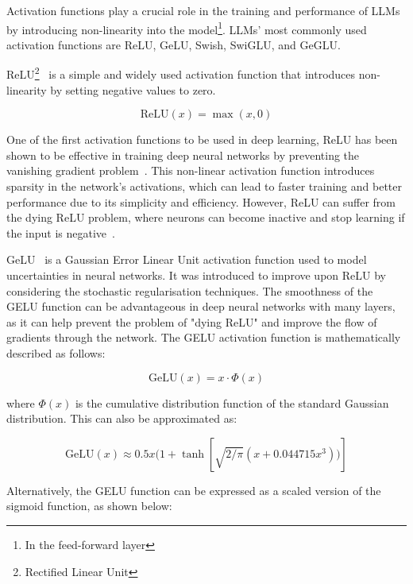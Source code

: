 Activation functions play a crucial role in the training and performance of LLMs by introducing non-linearity into the model\footnote{In the feed-forward layer}.
LLMs' most commonly used activation functions are ReLU, GeLU, Swish, SwiGLU, and GeGLU\@.

ReLU\footnote{Rectified Linear Unit}~\cite{nair2010rectified} is a simple and widely used activation function that introduces non-linearity by setting negative values to zero.

\begin{equation}
	\text{ReLU}(x) = \max(x, 0)
	\label{eq:relu}
\end{equation}

One of the first activation functions to be used in deep learning, ReLU has been shown to be effective in training deep neural networks by preventing the vanishing gradient problem~\cite{glorot2011deep}.
This non-linear activation function introduces sparsity in the network's activations, which can lead to faster training and better performance due to its simplicity and efficiency.
However, ReLU can suffer from the dying ReLU problem, where neurons can become inactive and stop learning if the input is negative~\cite{maas2013rectifier}.

GeLU~\cite{hendrycks2016gaussian} is a Gaussian Error Linear Unit activation function used to model uncertainties in neural networks.
It was introduced to improve upon ReLU by considering the stochastic regularisation techniques.
The smoothness of the GELU function can be advantageous in deep neural networks with many layers, as it can help prevent the problem of "dying ReLU" and improve the flow of gradients through the network.
The GELU activation function is mathematically described as follows:

\begin{equation}
	\text{GeLU}(x) = x \cdot \Phi(x)
	\label{eq:geluf}
\end{equation}

\noindent where \(\Phi(x)\) is the cumulative distribution function of the standard Gaussian distribution.
This can also be approximated as:

\begin{equation}
	\text{GeLU}(x) \approx 0.5x(1 + \tanh[\sqrt{2/\pi}(x + 0.044715x^3))]
	\label{eq:geluapprox1}
\end{equation}

Alternatively, the GELU function can be expressed as a scaled version of the sigmoid function, as shown below:

